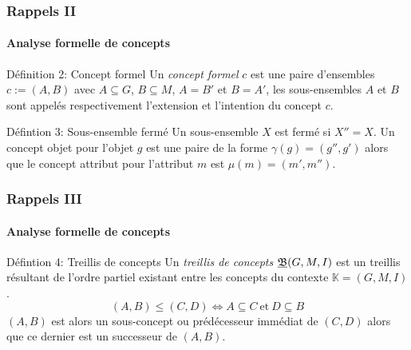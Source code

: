 \documentclass[french]{beamer}
\def\KK{\mathbb{K}}
\begin{document}
\begin{frame}
\frametitle{Rappels II}
\framesubtitle{Analyse formelle de concepts}
\begin{block}{Définition 2: Concept formel}
Un \emph{concept formel} $c$ est une paire d'ensembles $c:= (A,B)$ avec $A \subseteq G$, $B \subseteq M$, $A=B'$ et $B=A'$, les sous-ensembles $A$ et $B$ sont appelés respectivement l'extension et l'intention du concept $c$.
\end{block}
\begin{block}{Défintion 3: Sous-ensemble fermé}
Un sous-ensemble $X$ est fermé si $X''=X$. Un concept objet pour l'objet $g$ est une paire de la forme $\gamma(g)=(g'', g')$ alors que le concept attribut pour l'attribut $m$ est $\mu(m)=(m', m'')$.
\end{block}
\end{frame}

\begin{frame}
\frametitle{Rappels III}
\framesubtitle{Analyse formelle de concepts}
\begin{block}{Défintion 4: Treillis de concepts}
Un \textit{treillis de concepts} $\underline{{\mathfrak B}} (G,M,\mathrel{I})$ est un treillis résultant de l'ordre partiel existant entre les concepts du contexte $\KK = (G,M,I)$.
$$(A,B) \leq (C,D) \Leftrightarrow A \subseteq C\ \text{et}\ D \subseteq B$$
$(A, B)$ est alors un sous-concept ou prédécesseur immédiat de $(C, D)$ alors que ce dernier est un successeur de $(A, B)$.
\end{block}
\end{frame}
\end{document}
